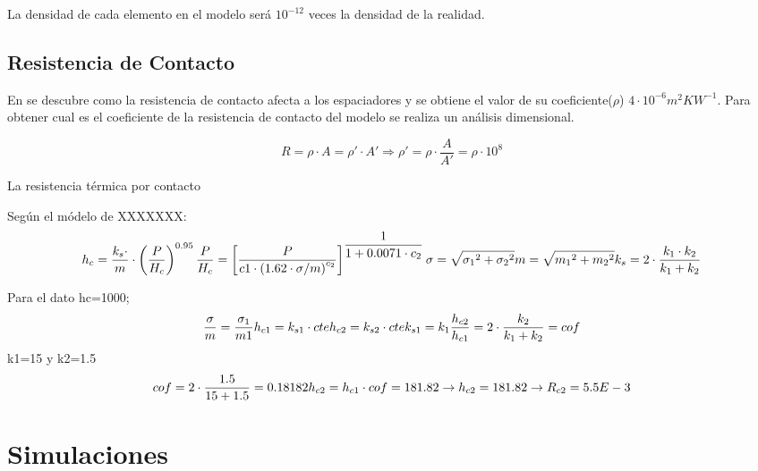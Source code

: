 La densidad de cada elemento en el modelo será $10^{-12}$ veces la densidad de la realidad.

\subsection{Resistencia de Contacto}
En \cite{noauthor_parallel-plate_nodate} se descubre como la resistencia de contacto afecta a los espaciadores y se obtiene el valor de su coeficiente($\rho$) $4\cdot 10^{-6}m^2 KW^{-1} $. Para obtener cual es el coeficiente de la resistencia de contacto del modelo se realiza un análisis dimensional.

\begin{equation}
	R= \rho \cdot A =\rho ' \cdot A' \Longrightarrow \rho '=\rho \cdot \dfrac{A}{A'}=\rho \cdot 10^8
\end{equation}

La resistencia térmica por contacto

Según el módelo de XXXXXXX:
\begin{equation}
	h_c=\dfrac{k_s\cdot}{m}\cdot \left( \dfrac{P}{H_c} \right)^{0.95} \\ \dfrac{P}{H_c} = \left[ \dfrac{P}{c1\cdot \left(1.62\cdot \sigma/m \right)^{c_2}}\right]^{\dfrac{1}{1+0.0071\cdot c_2}} \\	\sigma =\sqrt{{\sigma_1}^2+{\sigma_2}^2} \\ m=\sqrt{{m_1}^2+{m_2}^2}	\\ k_s=2\cdot \dfrac{k_1\cdot k_2}{k_1+k_2}
\end{equation}

Para el dato hc=1000;
\begin{equation}
	\dfrac{\sigma}{m}=\dfrac{\sigma_1}{m1}	\\ h_{c1}=k_{s1}\cdot cte \\ h_{c2}=k_{s2}\cdot cte	\\ k_{s1}=k_1 \\ \dfrac{h_{c2}}{h_{c1}}= 2\cdot \dfrac{k_2}{k_1+k_2}=cof
\end{equation}
k1=15 y k2=1.5
\begin{equation}
	cof=2\cdot \dfrac{1.5}{15+1.5}=0.18182
	\\ h_{c2}=h_{c1}\cdot cof=181.82 \rightarrow h_{c2}=181.82 \rightarrow R_{c2}=5.5E-3
\end{equation}

\section{Simulaciones}
